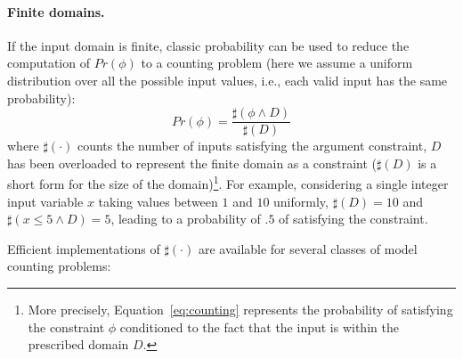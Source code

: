 \paragraph{Finite domains.} 

If the input domain is finite, classic probability can be used to reduce the computation of $Pr(\phi)$ to a counting problem (here we assume a uniform distribution over all the possible input values, i.e., each valid input has the same probability):
%
\begin{equation}\label{eq:counting}
	Pr(\phi) = \frac{\sharp(\phi \land D)}{\sharp(D)}
\end{equation}
%
\noindent where $\sharp(\cdot)$ counts the number of inputs satisfying the argument constraint, $D$ has been overloaded to represent the finite domain as a constraint ($\sharp(D)$ is a short form for the size of the domain)\footnote{More precisely, Equation~\eqref{eq:counting} represents the probability of satisfying the constraint $\phi$ conditioned to the fact that the input is within the prescribed domain $D$.}. For example, considering a single integer input variable $x$ taking values between $1$ and $10$ uniformly, $\sharp(D)=10$ and $\sharp(x\leq5 \land D)=5$, leading to a probability of $.5$ of satisfying the constraint.

Efficient implementations of $\sharp(\cdot)$ are available for several classes of model counting problems:

